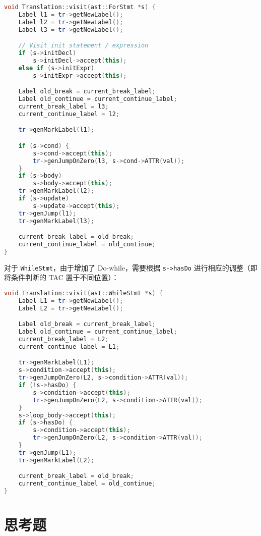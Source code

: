 \documentclass[a4paper]{article}
\begin{document}
\begin{lstlisting}[language=c++]
void Translation::visit(ast::ForStmt *s) {
    Label l1 = tr->getNewLabel();
    Label l2 = tr->getNewLabel();
    Label l3 = tr->getNewLabel();

    // Visit init statement / expression
    if (s->initDecl)
        s->initDecl->accept(this);
    else if (s->initExpr)
        s->initExpr->accept(this);

    Label old_break = current_break_label;
    Label old_continue = current_continue_label;
    current_break_label = l3;
    current_continue_label = l2;

    tr->genMarkLabel(l1);

    if (s->cond) {
        s->cond->accept(this);
        tr->genJumpOnZero(l3, s->cond->ATTR(val));
    }
    if (s->body)
        s->body->accept(this);
    tr->genMarkLabel(l2);
    if (s->update)
        s->update->accept(this);
    tr->genJump(l1);
    tr->genMarkLabel(l3);

    current_break_label = old_break;
    current_continue_label = old_continue;
}
\end{lstlisting}

对于 \texttt{WhileStmt}，由于增加了 Do-while，需要根据 \texttt{s->hasDo} 进行相应的调整（即将条件判断的 TAC 置于不同位置）：

\begin{lstlisting}[language=c++]
void Translation::visit(ast::WhileStmt *s) {
    Label L1 = tr->getNewLabel();
    Label L2 = tr->getNewLabel();

    Label old_break = current_break_label;
    Label old_continue = current_continue_label;
    current_break_label = L2;
    current_continue_label = L1;

    tr->genMarkLabel(L1);
    s->condition->accept(this);
    tr->genJumpOnZero(L2, s->condition->ATTR(val));
    if (!s->hasDo) {
        s->condition->accept(this);
        tr->genJumpOnZero(L2, s->condition->ATTR(val));
    }
    s->loop_body->accept(this);
    if (s->hasDo) {
        s->condition->accept(this);
        tr->genJumpOnZero(L2, s->condition->ATTR(val));
    }
    tr->genJump(L1);
    tr->genMarkLabel(L2);

    current_break_label = old_break;
    current_continue_label = old_continue;
}
\end{lstlisting}

\section{思考题}
\end{document}
